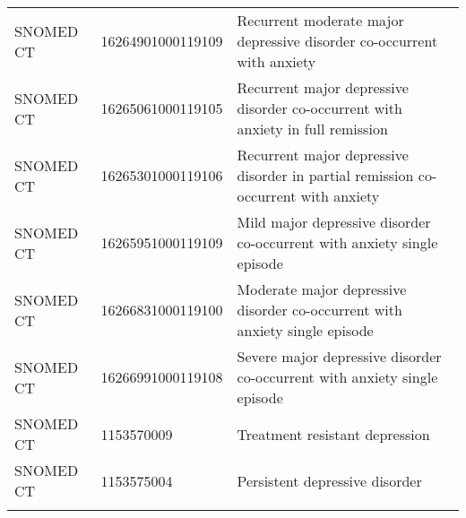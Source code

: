 \begin{longtable}{p{}p{}p{}}
  SNOMED CT & 16264901000119109 & Recurrent moderate major depressive disorder co-occurrent with anxiety \\ 
  SNOMED CT & 16265061000119105 & Recurrent major depressive disorder co-occurrent with anxiety in full remission \\ 
  SNOMED CT & 16265301000119106 & Recurrent major depressive disorder in partial remission co-occurrent with anxiety \\ 
  SNOMED CT & 16265951000119109 & Mild major depressive disorder co-occurrent with anxiety single episode \\ 
  SNOMED CT & 16266831000119100 & Moderate major depressive disorder co-occurrent with anxiety single episode \\ 
  SNOMED CT & 16266991000119108 & Severe major depressive disorder co-occurrent with anxiety single episode \\ 
  SNOMED CT & 1153570009 & Treatment resistant depression \\ 
  SNOMED CT & 1153575004 & Persistent depressive disorder \\ 
  \hline
\label{tab:codes_depression}
\end{longtable}
